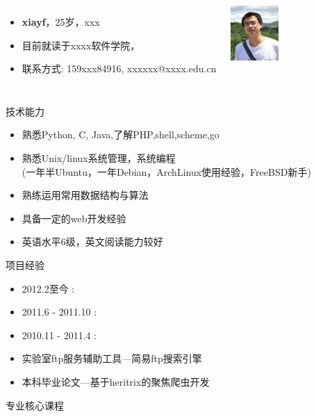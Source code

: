 \documentclass[8pt,handout]{beamer}
\begin{document}
\begin{CJK*}{UTF8}{gkai}
\begin{frame}{}
\begin{columns}
	\column{7cm}
	\begin{itemize}
		\item {\bf\large xiayf}，25岁，xxx
		\item 目前就读于{\large\color{blue}xxxx}软件学院，{\large\color{blue}{研二}}
		\item 联系方式: 159xxx84916, xxxxxx@xxxx.edu.cn 
	\end{itemize}
	\column{3cm}
		\includegraphics[width=1.8cm]{xiayf.jpg}
\end{columns}
\begin{block}{技术能力}
\begin{itemize}
	\item 熟悉Python, C, Java,了解PHP,shell,scheme,go
	\item 熟悉Unix/linux系统管理，系统编程\\(一年半Ubuntu，一年Debian，ArchLinux使用经验，FreeBSD新手)
	\item 熟练运用常用数据结构与算法
	\item 具备一定的web开发经验
	\item 英语水平6级，英文阅读能力较好
\end{itemize}
\end{block}
\begin{block}{项目经验}
\begin{itemize}
	\item 2012.2至今 : {\color{blue}{基于Web的群体机器人远程控制系统}}
	\item 2011.6 - 2011.10 : {\color{blue}{机器人多目标跟踪}}
	\item 2010.11 - 2011.4 : {\color{blue}{群体机器人程序批量烧录}}
	\item 实验室ftp服务辅助工具---简易ftp搜索引擎
	\item 本科毕业论文---基于heritrix的聚焦爬虫开发
\end{itemize}
\end{block}
\end{frame}
\begin{frame}{}
\begin{block}{专业核心课程}
\begin{itemize}

\end{itemize}
\end{block}
\end{frame}
\end{CJK*}
\end{document}

